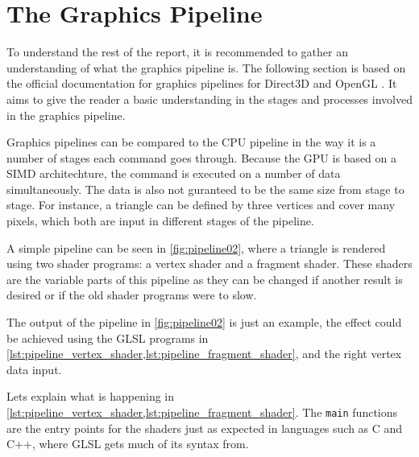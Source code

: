 \section{The Graphics Pipeline} \label{sec:pipeline} %
\begin{sectionmeta}
To understand the rest of the report, it is recommended to gather an understanding of what the graphics pipeline is.
The following section is based on the official documentation for graphics pipelines for Direct3D and OpenGL \cite{khronos????pipeline, microsoft????pipeline}.
It aims to give the reader a basic understanding in the stages and processes involved in the graphics pipeline.
\end{sectionmeta}

Graphics pipelines can be compared to the \gls{CPU} pipeline in the way it is a number of stages each command goes through.
Because the \gls{GPU} is based on a \gls{SIMD} architechture, the command is executed on a number of data simultaneously.
The data is also not guranteed to be the same size from stage to stage.
For instance, a triangle can be defined by three vertices and cover many pixels, which both are input in different stages of the pipeline.

A simple pipeline can be seen in \cref{fig:pipeline02}, where a triangle is rendered using two shader programs: a vertex shader and a fragment shader.
These shaders are the variable parts of this pipeline as they can be changed if another result is desired or if the old shader programs were to slow.


The output of the pipeline in \cref{fig:pipeline02} is just an example, the effect could be achieved using the \gls{GLSL} programs in \cref{lst:pipeline_vertex_shader,lst:pipeline_fragment_shader}, and the right vertex data input.

Lets explain what is happening in \cref{lst:pipeline_vertex_shader,lst:pipeline_fragment_shader}. 
The \texttt{main} functions are the entry points for the shaders just as expected in languages such as C and C++, where \gls{GLSL} gets much of its syntax from.

